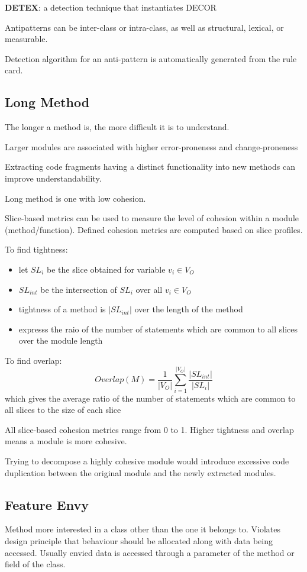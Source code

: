 \documentclass[11pt]{article}
\begin{document}
\textbf{DETEX}: a detection technique that instantiates DECOR

Antipatterns can be inter-class or intra-class, as well as structural, lexical, or measurable.

Detection algorithm for an anti-pattern is automatically generated from the rule card.
\subsection{Long Method}
\label{sec:orgfd7ef1c}
The longer a method is, the more difficult it is to understand.

Larger modules are associated with higher error-proneness and change-proneness

Extracting code fragments having a distinct functionality into new methods can improve
understandability.

Long method is one with low cohesion.

Slice-based metrics can be used to measure the level of cohesion within a module (method/function).
Defined cohesion metrics are computed based on slice profiles.

To find tightness:
\begin{itemize}
\item let \(SL_{i}\) be the slice obtained for variable \(v_{i} \in V_{O}\)
\item \(SL_{int}\) be the intersection of \(SL_{i}\) over all \(v_{i} \in V_{O}\)
\item tightness of a method is \(|SL_{int}|\) over the length of the method
\item expresss the raio of the number of statements which are common to all slices over the module
length
\end{itemize}

To find overlap:
$$
Overlap(M) = \frac{1}{|V_{O}|} \sum_{i = 1}^{|V_{O}|} \frac{|SL_{int}|}{|SL_{i}|}
$$
which gives the average ratio of the number of statements which are common to all slices to the size
of each slice

All slice-based cohesion metrics range from 0 to 1.
Higher tightness and overlap means a module is more cohesive.

Trying to decompose a highly cohesive module would introduce excessive code duplication between
the original module and the newly extracted modules.
\subsection{Feature Envy}
\label{sec:org530e4b9}
Method more interested in a class other than the one it belongs to.
Violates design principle that behaviour should be allocated along with data being accessed.
Usually envied data is accessed through a parameter of the method or field of the class.
\end{document}

